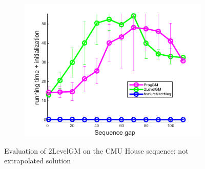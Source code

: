 \begin{figure}[h]
\begin{subfigure}[b]{0.33\textwidth}
		\end{subfigure}
		\begin{subfigure}[b]{0.32\textwidth}
			\centering
			\includegraphics[scale=0.25]{"chapter3/fig/HouseSeq2/anchor_descr/using_cpd_afftrafo/solution/performance/time_summary"}
		\end{subfigure} 	
	\caption[Evaluation of 2LevelGM on the CMU House sequence]{Evaluation of 2LevelGM on the CMU House sequence: not extrapolated solution} \label{fig:House_sol}
\end{figure}

